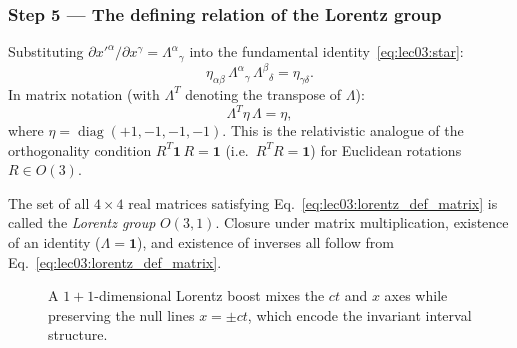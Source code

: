 \subsubsection*{Step 5 — The defining relation of the Lorentz group}

Substituting $\partial x'^\alpha/\partial x^\gamma = \Lambda^\alpha{}_\gamma$
into the fundamental identity~\eqref{eq:lec03:star}:
\begin{equation}
  \eta_{\alpha\beta}\,\Lambda^\alpha{}_\gamma\,\Lambda^\beta{}_\delta
  = \eta_{\gamma\delta}.
  \label{eq:lec03:lorentz_def_index}
\end{equation}
In matrix notation (with $\Lambda^T$ denoting the transpose of
$\Lambda$):
\begin{equation}
  \boxed{\Lambda^T \eta\,\Lambda = \eta,}
  \label{eq:lec03:lorentz_def_matrix}
\end{equation}
where $\eta = \operatorname{diag}(+1,-1,-1,-1)$.  This is the
relativistic analogue of the orthogonality condition
$R^T \mathbf{1}\,R = \mathbf{1}$ (i.e.\ $R^T R = \mathbf{1}$) for
Euclidean rotations $R\in O(3)$.

The set of all $4\times 4$ real matrices satisfying
Eq.~\eqref{eq:lec03:lorentz_def_matrix} is called the
\emph{Lorentz group} $O(3,1)$.  Closure under matrix multiplication,
existence of an identity ($\Lambda = \mathbf{1}$), and existence of
inverses all follow from Eq.~\eqref{eq:lec03:lorentz_def_matrix}.

\begin{figure}[h]
  \centering
  \caption{A $1+1$-dimensional Lorentz boost mixes the $ct$ and $x$
  axes while preserving the null lines $x=\pm ct$, which encode the
  invariant interval structure.}
  \label{fig:lec03:boosted-axes}
\end{figure}

